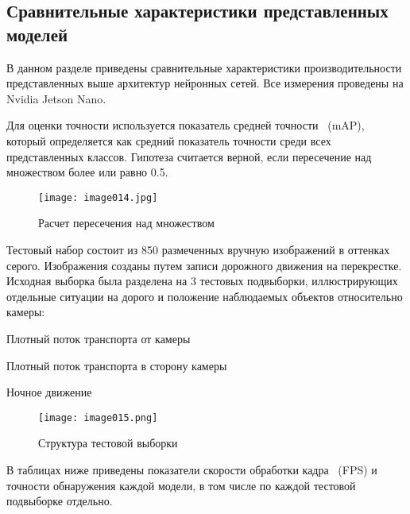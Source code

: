 \subsection{Сравнительные характеристики представленных моделей}

В данном разделе приведены сравнительные характеристики производительности представленных выше архитектур нейронных сетей. Все измерения проведены на Nvidia Jetson Nano.

Для оценки точности используется показатель средней точности ~(mAP), который определяется как средний показатель точности среди всех представленных классов. Гипотеза считается верной, если пересечение над множеством более или равно 0.5.

\begin{figure}[htbp]
\centering
\texttt{[image: image014.jpg]}
\caption{Расчет пересечения над множеством}%
\label{fig:how-to-do-research}
\end{figure}

Тестовый набор состоит из 850 размеченных вручную изображений в оттенках серого. Изображения созданы путем записи дорожного движения на перекрестке. Исходная выборка была разделена на 3 тестовых подвыборки, иллюстрирующих отдельные ситуации на дорого и положение наблюдаемых объектов относительно камеры:
%
\begin{itemize*}
  \item Плотный поток транспорта от камеры
  \item Плотный поток транспорта в сторону камеры
  \item Ночное движение  
\end{itemize*}
%

\begin{figure}[htbp]
\centering
\texttt{[image: image015.png]}
\caption{Структура тестовой выборки}%
\label{fig:how-to-do-research}
\end{figure}

В таблицах ниже приведены показатели скорости обработки кадра ~(FPS) и точности обнаружения каждой модели, в том числе по каждой тестовой подвыборке отдельно.

